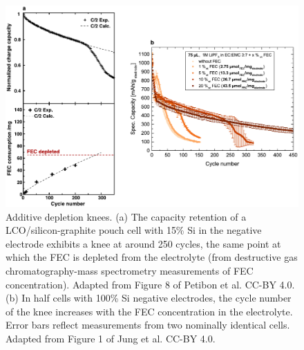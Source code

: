 \documentclass[journal=jpclcd,manuscript=article]{achemso}
\begin{document}
\begin{figure}[ht]
\centering
\includegraphics[scale = 0.9]{final_figures/fec_depletion.pdf}
\caption{Additive depletion knees.
(a) The capacity retention of a LCO/silicon-graphite pouch cell with 15\% Si in the negative electrode exhibits a knee at around 250 cycles, the same point at which the FEC is depleted from the electrolyte (from destructive gas chromatography-mass spectrometry measurements of FEC concentration). Adapted from Figure 8 of Petibon et al.\cite{petibon_studies_2016} CC-BY 4.0.
(b) In half cells with 100\% Si negative electrodes, the cycle number of the knee increases with the FEC concentration in the electrolyte.
Error bars reflect measurements from two nominally identical cells.
Adapted from Figure 1 of Jung et al.\cite{jung_consumption_2016} CC-BY 4.0.}  
\label{fig:fec_knee}
\end{figure}
\end{document}
